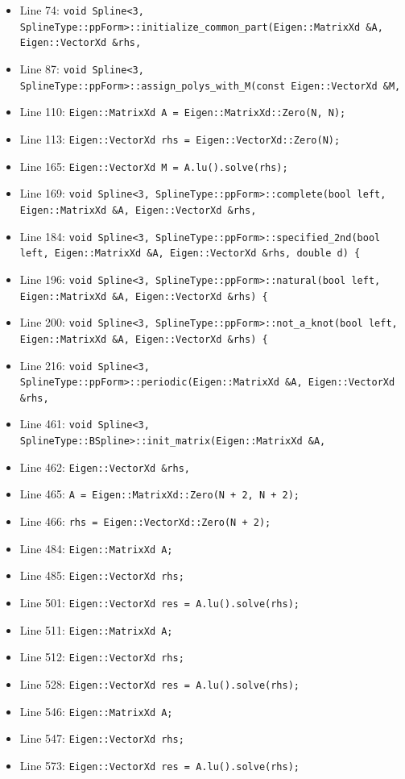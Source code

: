 \documentclass[a4paper,7pt,onecolumn,oneside]{article}
\begin{document}
\begin{itemize}
    \item Line 74: \texttt{void Spline<3, SplineType::ppForm>::initialize\_common\_part(Eigen::MatrixXd \&A, Eigen::VectorXd \&rhs,}
    \item Line 87: \texttt{void Spline<3, SplineType::ppForm>::assign\_polys\_with\_M(const Eigen::VectorXd \&M,}
    \item Line 110: \texttt{Eigen::MatrixXd A = Eigen::MatrixXd::Zero(N, N);}
    \item Line 113: \texttt{Eigen::VectorXd rhs = Eigen::VectorXd::Zero(N);}
    \item Line 165: \texttt{Eigen::VectorXd M = A.lu().solve(rhs);}
    \item Line 169: \texttt{void Spline<3, SplineType::ppForm>::complete(bool left, Eigen::MatrixXd \&A, Eigen::VectorXd \&rhs,}
    \item Line 184: \texttt{void Spline<3, SplineType::ppForm>::specified\_2nd(bool left, Eigen::MatrixXd \&A, Eigen::VectorXd \&rhs, double d) \{}
    \item Line 196: \texttt{void Spline<3, SplineType::ppForm>::natural(bool left, Eigen::MatrixXd \&A, Eigen::VectorXd \&rhs) \{}
    \item Line 200: \texttt{void Spline<3, SplineType::ppForm>::not\_a\_knot(bool left, Eigen::MatrixXd \&A, Eigen::VectorXd \&rhs) \{}
    \item Line 216: \texttt{void Spline<3, SplineType::ppForm>::periodic(Eigen::MatrixXd \&A, Eigen::VectorXd \&rhs,}
    \item Line 461: \texttt{void Spline<3, SplineType::BSpline>::init\_matrix(Eigen::MatrixXd \&A,}
    \item Line 462: \texttt{Eigen::VectorXd \&rhs,}
    \item Line 465: \texttt{A = Eigen::MatrixXd::Zero(N + 2, N + 2);}
    \item Line 466: \texttt{rhs = Eigen::VectorXd::Zero(N + 2);}
    \item Line 484: \texttt{Eigen::MatrixXd A;}
    \item Line 485: \texttt{Eigen::VectorXd rhs;}
    \item Line 501: \texttt{Eigen::VectorXd res = A.lu().solve(rhs);}
    \item Line 511: \texttt{Eigen::MatrixXd A;}
    \item Line 512: \texttt{Eigen::VectorXd rhs;}
    \item Line 528: \texttt{Eigen::VectorXd res = A.lu().solve(rhs);}
    \item Line 546: \texttt{Eigen::MatrixXd A;}
    \item Line 547: \texttt{Eigen::VectorXd rhs;}
    \item Line 573: \texttt{Eigen::VectorXd res = A.lu().solve(rhs);}
\end{itemize}
\end{document}
